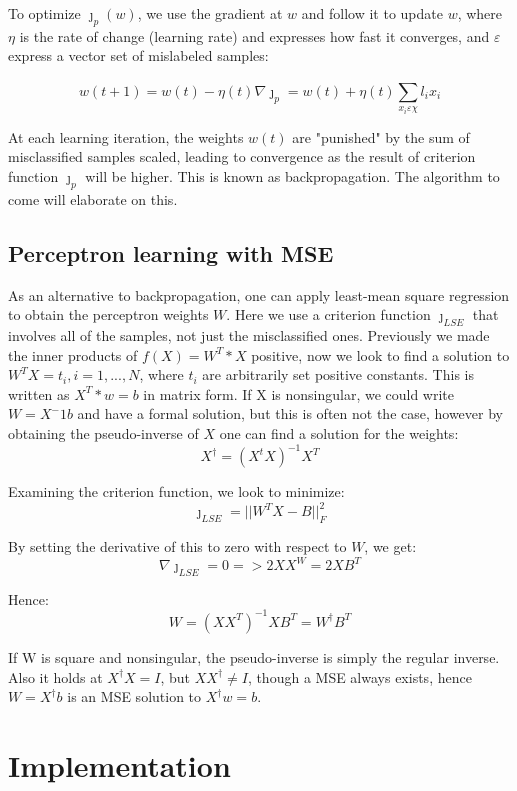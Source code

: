 \documentclass[journal]{IEEEtran}
\begin{document}
To optimize ${\jmath}_{p}(w)$, we use the gradient at $w$ and follow it to update $w$, where $\eta$ is the rate of change (learning rate) and expresses how fast it converges, and $\varepsilon$ express a vector set of mislabeled samples:

$$ w(t+1) = w(t) - \eta(t) \nabla{\jmath}_{p} = w(t) + \eta(t) \sum_{x_{i} \varepsilon \chi}^{} l_{i} x_{i} $$

At each learning iteration, the weights $w(t)$ are "punished" by the sum of misclassified samples scaled, leading to convergence as the result of criterion function ${\jmath}_{p}$ will be higher. This is known as backpropagation. The algorithm to come will elaborate on this.

\subsection{Perceptron learning with MSE}

As an alternative to backpropagation, one can apply least-mean square regression to obtain the perceptron weights $W$. Here we use a criterion function ${\jmath}_{LSE}$ that involves all of the samples, not just the misclassified ones. Previously we made the inner products of $f(X) = W^T*X$ positive, now we look to find a solution to $W^T X = t_{i}, i = 1, ..., N$, where $t_{i}$ are arbitrarily set positive constants. This is written as $X^T*w = b$ in matrix form. If X is nonsingular, we could write $W = X^-1 b$ and have a formal solution, but this is often not the case, however by obtaining the pseudo-inverse of $X$ one can find a solution for the weights: $$ X^\dagger = (X^tX)^{-1}X^T $$

Examining the criterion function, we look to minimize: $$ {\jmath}_{LSE} = ||W^T X - B||^2_{F} $$

By setting the derivative of this to zero with respect to $W$, we get: $$ \nabla{\jmath}_{LSE} = 0 => 2XX^W = 2XB^T $$

Hence: $$ W = (XX^T)^{-1} XB^T = W^\dagger B^T $$

If W is square and nonsingular, the pseudo-inverse is simply the regular inverse. Also it holds at $X^\dagger X = I$, but $X X^\dagger \neq I$, though a MSE always exists, hence $W = X^\dagger b$ is an MSE solution to $X^\dagger w = b$.

\section{Implementation}
\end{document}

